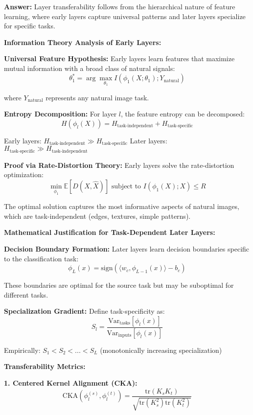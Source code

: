 \documentclass[12pt]{article}
\newcommand{\answer}[1]{{\color{answercolor}\textbf{Answer:} #1}}
\newcommand{\explanation}[1]{{\color{explanationcolor}#1}}
\begin{document}
\begin{enumerate}[(a)]
    \answer{Layer transferability follows from the hierarchical nature of feature learning, where early layers capture universal patterns and later layers specialize for specific tasks.}
    
    \explanation{
    \textbf{Information Theory Analysis of Early Layers:}
    
    \textbf{Universal Feature Hypothesis:}
    Early layers learn features that maximize mutual information with a broad class of natural signals:
    $$\theta_1^* = \arg\max_{\theta_1} I(\phi_1(X; \theta_1); Y_{\text{natural}})$$
    
    where $Y_{\text{natural}}$ represents any natural image task.
    
    \textbf{Entropy Decomposition:}
    For layer $l$, the feature entropy can be decomposed:
    $$H(\phi_l(X)) = H_{\text{task-independent}} + H_{\text{task-specific}}$$
    
    Early layers: $H_{\text{task-independent}} \gg H_{\text{task-specific}}$
    Later layers: $H_{\text{task-specific}} \gg H_{\text{task-independent}}$
    
    \textbf{Proof via Rate-Distortion Theory:}
    Early layers solve the rate-distortion optimization:
    $$\min_{\phi_1} \mathbb{E}[D(X, \hat{X})] \text{ subject to } I(\phi_1(X); X) \leq R$$
    
    The optimal solution captures the most informative aspects of natural images, which are task-independent (edges, textures, simple patterns).
    
    \textbf{Mathematical Justification for Task-Dependent Later Layers:}
    
    \textbf{Decision Boundary Formation:}
    Later layers learn decision boundaries specific to the classification task:
    $$\phi_L(x) = \text{sign}(\langle w_c, \phi_{L-1}(x) \rangle - b_c)$$
    
    These boundaries are optimal for the source task but may be suboptimal for different tasks.
    
    \textbf{Specialization Gradient:}
    Define task-specificity as:
    $$S_l = \frac{\text{Var}_{\text{tasks}}[\phi_l(x)]}{\text{Var}_{\text{inputs}}[\phi_l(x)]}$$
    
    Empirically: $S_1 < S_2 < ... < S_L$ (monotonically increasing specialization)
    
    \textbf{Transferability Metrics:}
    
    \textbf{1. Centered Kernel Alignment (CKA):}
    $$\text{CKA}(\phi_l^{(s)}, \phi_l^{(t)}) = \frac{\text{tr}(K_s K_t)}{\sqrt{\text{tr}(K_s^2)\text{tr}(K_t^2)}}$$
    
}
\end{enumerate}
\end{document}

